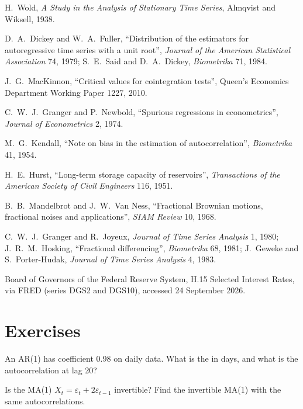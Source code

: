 \begin{omsources}
\item H.~Wold, \emph{A Study in the Analysis of Stationary Time Series}, Almqvist and Wiksell, 1938.
\item D.~A.~Dickey and W.~A.~Fuller, ``Distribution of the estimators for autoregressive time series with a unit root'', \emph{Journal of the American Statistical
Association} 74, 1979; S.~E.~Said and D.~A.~Dickey, \emph{Biometrika} 71, 1984.
\item J.~G.~MacKinnon, ``Critical values for cointegration tests'', Queen's Economics Department Working Paper 1227, 2010.
\item C.~W.~J.~Granger and P.~Newbold, ``Spurious regressions in econometrics'', \emph{Journal of Econometrics} 2, 1974.
\item M.~G.~Kendall, ``Note on bias in the estimation of autocorrelation'', \emph{Biometrika} 41, 1954.
\item H.~E.~Hurst, ``Long-term storage capacity of reservoirs'', \emph{Transactions of the American Society of Civil Engineers} 116, 1951.
\item B.~B.~Mandelbrot and J.~W.~Van Ness, ``Fractional Brownian motions, fractional noises and applications'', \emph{SIAM Review} 10, 1968.
\item C.~W.~J.~Granger and R.~Joyeux, \emph{Journal of Time Series Analysis} 1, 1980; J.~R.~M.~Hosking, ``Fractional differencing'', \emph{Biometrika} 68, 1981;
J.~Geweke and S.~Porter-Hudak, \emph{Journal of Time Series Analysis} 4, 1983.
\item Board of Governors of the Federal Reserve System, H.15 Selected Interest Rates, via FRED (series DGS2 and DGS10), accessed 24 September 2026.
\end{omsources}

\section{Exercises}

\begin{exercise}[$\star$]\label{exo:qm:linear-time-series:1}
An AR(1) has coefficient 0.98 on daily data. What is the  in days, and what is the autocorrelation at lag 20?
\end{exercise}

\begin{exercise}[$\star$]\label{exo:qm:linear-time-series:2}
Is the MA(1) $X_t = \varepsilon_t + 2\varepsilon_{t-1}$ invertible? Find the invertible MA(1) with the same autocorrelations.
\end{exercise}

